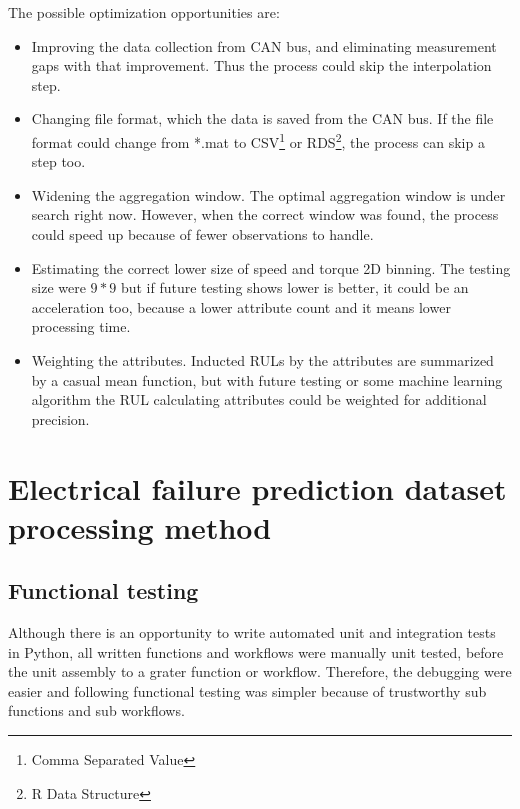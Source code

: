The possible optimization opportunities are:
\begin{itemize}
	\item{Improving the data collection from CAN bus, and eliminating measurement gaps with that improvement.} Thus the process could skip the interpolation step. 
	\item{Changing file format, which the data is saved from the CAN bus.} If the file format could change from *.mat to CSV\footnote{Comma Separated Value} or RDS\footnote{R Data Structure}, the process can skip a step too.
	\item{Widening the aggregation window.} The optimal aggregation window is under search right now. However, when the correct window was found, the process could speed up because of fewer observations to handle.
	\item{Estimating the correct lower size of speed and torque 2D binning.} The testing size were $9*9$ but if future testing shows lower is better, it could be an acceleration too, because a lower attribute count and it means lower processing time.
	\item{Weighting the attributes.} Inducted RULs by the attributes are summarized by a casual mean function, but with future testing or some machine learning algorithm the RUL calculating attributes could be weighted for additional precision.
\end{itemize} 
\section{Electrical failure prediction dataset processing method}
\subsection{Functional testing}
Although there is an opportunity to write automated unit and integration tests in Python, all written functions and workflows were manually unit tested, before the unit assembly to a grater function or workflow. Therefore, the debugging were easier and following functional testing was simpler because of trustworthy sub functions and sub workflows.

